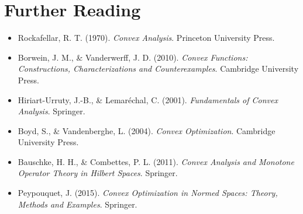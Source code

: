 \documentclass[12pt,a4paper]{article}
\theoremstyle{definition}
\begin{document}
\section{Further Reading}

\begin{itemize}
\item Rockafellar, R. T. (1970). \textit{Convex Analysis}. Princeton University Press.
\item Borwein, J. M., \& Vanderwerff, J. D. (2010). \textit{Convex Functions: Constructions, Characterizations and Counterexamples}. Cambridge University Press.
\item Hiriart-Urruty, J.-B., \& Lemaréchal, C. (2001). \textit{Fundamentals of Convex Analysis}. Springer.
\item Boyd, S., \& Vandenberghe, L. (2004). \textit{Convex Optimization}. Cambridge University Press.
\item Bauschke, H. H., \& Combettes, P. L. (2011). \textit{Convex Analysis and Monotone Operator Theory in Hilbert Spaces}. Springer.
\item Peypouquet, J. (2015). \textit{Convex Optimization in Normed Spaces: Theory, Methods and Examples}. Springer.
\end{itemize}
\end{document}
